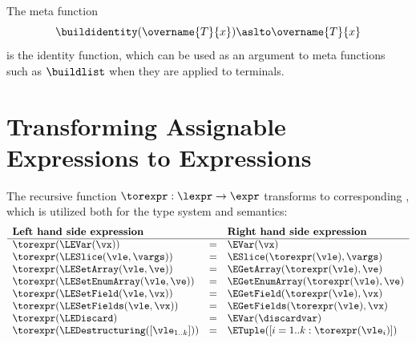 \hypertarget{build-identity}{}
The meta function
\[
\buildidentity(\overname{T}{x}) \aslto \overname{T}{x}
\]
is the identity function, which can be used as an argument to meta functions such as $\buildlist$ when they are applied
to terminals.

\begin{mathpar}
\end{mathpar}

\section{Transforming Assignable Expressions to Expressions\label{sec:LeftToRight}}
\hypertarget{def-rexpr}{}
The recursive function $\torexpr : \lexpr \rightarrow \expr$ transforms
\assignableexpressions{} to corresponding \rhsexpressions{},
which is utilized both for the type system and semantics:
\[
\begin{array}{lcl}
  \textbf{Left hand side expression} & & \textbf{Right hand side expression}\\
  \hline
  \torexpr(\LEVar(\vx)) &=& \EVar(\vx)\\
  \torexpr(\LESlice(\vle, \vargs)) &=& \ESlice(\torexpr(\vle), \vargs)\\
  \torexpr(\LESetArray(\vle, \ve)) &=& \EGetArray(\torexpr(\vle), \ve)\\
  \torexpr(\LESetEnumArray(\vle, \ve)) &=& \EGetEnumArray(\torexpr(\vle), \ve)\\
  \torexpr(\LESetField(\vle, \vx)) &=& \EGetField(\torexpr(\vle), \vx)\\
  \torexpr(\LESetFields(\vle, \vx)) &=& \EGetFields(\torexpr(\vle), \vx)\\
  \torexpr(\LEDiscard) &=& \EVar(\discardvar)\\
  \torexpr(\LEDestructuring([\vle_{1..k}])) &=& \ETuple([i=1..k: \torexpr(\vle_i)])\\
\end{array}
\]

